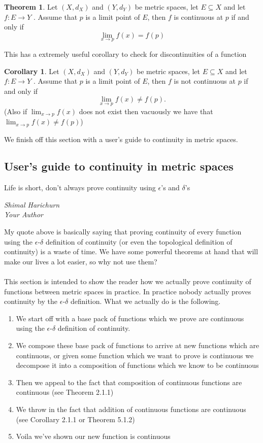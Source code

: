 \documentclass[12pt]{article}
\theoremstyle{definition}
\newtheorem{theorem}{Theorem}
\numberwithin{theorem}{subsection}
\newtheorem{corollary}{Corollary}
\numberwithin{corollary}{subsection}
\theoremstyle{remark}
\theoremstyle{point}
\begin{document}
	 \begin{theorem}
	 	Let $(X, d_X)$ and $(Y, d_Y)$ be metric spaces, let $E \subseteq X$ and let $f : E \to Y$ . Assume that $p$ is a limit point of $E$, then $f$ is continuous at $p$ if and only if $$\lim_{x \to p} f(x) = f(p)$$
	 \end{theorem}
	 
	 This has a extremely useful corollary to check for discontinuities of a function
	 
	 \begin{corollary}
	 	Let $(X, d_X)$ and $(Y, d_Y)$ be metric spaces, let $E \subseteq X$ and let $f : E \to Y$ . Assume that $p$ is a limit point of $E$, then $f$ is not continuous at $p$ if and only if $$\lim_{x \to p} f(x) \neq f(p).$$ (Also if $ \lim_{x \to p} f(x)$ does not exist then vacuously we have that $\lim_{x \to p} f(x) \neq f(p)$)
	 \end{corollary}
	 
	 We finish off this section with a user's guide to continuity in metric spaces.
	 
	 \subsection{User's guide to continuity in metric spaces}
	 
	 \epigraph{Life is short, don't always prove continuity using $\epsilon$'s and $\delta$'s}{\textit{Shimal Harichurn \\ Your Author}}
	 
	 My quote above is basically saying that proving continuity of every function using the $\epsilon$-$\delta$ definition of continuity (or even the topological definition of continuity) is a waste of time. We have some powerful theorems at hand that will make our lives a lot easier, so why not use them?  \\ \\ This section is intended to show the reader how we actually prove continuity of functions between metric spaces in practice. In practice nobody actually proves continuity by the $\epsilon$-$\delta$ definition. What we actually do is the following.
	 
	 
	 \begin{enumerate}
	 	\item We start off with a base pack of functions which we prove are continuous using the  $\epsilon$-$\delta$ definition of continuity. 
	 	\item We compose these base pack of functions to arrive at new functions which are continuous, or given some function which we want to prove is continuous we decompose it into a composition of functions which we know to be continuous
	 	\item Then we appeal to the fact that composition of continuous functions are continuous (see Theorem 2.1.1)
	 	\item We throw in the fact that addition of continuous functions are continuous (see Corollary 2.1.1 or Theorem 5.1.2)
	 	\item Voila we've shown our new function is continuous
	 \end{enumerate}
	 
\end{document}
